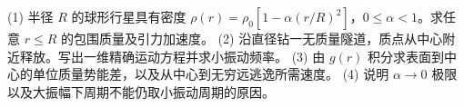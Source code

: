 (1) 半径 \(R\) 的球形行星具有密度 \(\rho(r)=\rho_0[1-\alpha(r/R)^2]\)，\(0\le\alpha<1\)。求任意 \(r\le R\) 的包围质量及引力加速度。
(2) 沿直径钻一无质量隧道，质点从中心附近释放。写出一维精确运动方程并求小振动频率。
(3) 由 \(g(r)\) 积分求表面到中心的单位质量势能差，以及从中心到无穷远逃逸所需速度。
(4) 说明 \(\alpha\to0\) 极限以及大振幅下周期不能仍取小振动周期的原因。
